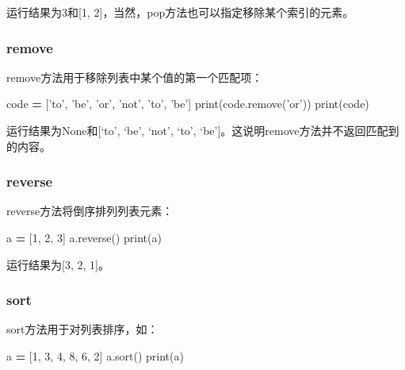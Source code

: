 \documentclass[]{ctexbook}
\newenvironment{Shaded}{\begin{snugshade}}{\end{snugshade}}
\newcommand{\BuiltInTok}[1]{#1}
\newcommand{\DecValTok}[1]{\textcolor[rgb]{0.00,0.00,0.81}{#1}}
\newcommand{\NormalTok}[1]{#1}
\newcommand{\OperatorTok}[1]{\textcolor[rgb]{0.81,0.36,0.00}{\textbf{#1}}}
\newcommand{\StringTok}[1]{\textcolor[rgb]{0.31,0.60,0.02}{#1}}
\begin{document}
运行结果为3和{[}1, 2{]}，当然，pop方法也可以指定移除某个索引的元素。

\hypertarget{remove}{%
\subsubsection{remove}\label{remove}}

remove方法用于移除列表中某个值的第一个匹配项：

\begin{Shaded}
\begin{Highlighting}[]
\NormalTok{code }\OperatorTok{=}\NormalTok{ [}\StringTok{'to'}\NormalTok{, }\StringTok{'be'}\NormalTok{, }\StringTok{'or'}\NormalTok{, }\StringTok{'not'}\NormalTok{, }\StringTok{'to'}\NormalTok{, }\StringTok{'be'}\NormalTok{]}
\BuiltInTok{print}\NormalTok{(code.remove(}\StringTok{'or'}\NormalTok{))}
\BuiltInTok{print}\NormalTok{(code)}
\end{Highlighting}
\end{Shaded}

运行结果为None和{[}`to', `be', `not', `to', `be'{]}。这说明remove方法并不返回匹配到的内容。

\hypertarget{reverse}{%
\subsubsection{reverse}\label{reverse}}

reverse方法将倒序排列列表元素：

\begin{Shaded}
\begin{Highlighting}[]
\NormalTok{a }\OperatorTok{=}\NormalTok{ [}\DecValTok{1}\NormalTok{, }\DecValTok{2}\NormalTok{, }\DecValTok{3}\NormalTok{]}
\NormalTok{a.reverse()}
\BuiltInTok{print}\NormalTok{(a)}
\end{Highlighting}
\end{Shaded}

运行结果为{[}3, 2, 1{]}。

\hypertarget{sort}{%
\subsubsection{sort}\label{sort}}

sort方法用于对列表排序，如：

\begin{Shaded}
\begin{Highlighting}[]
\NormalTok{a }\OperatorTok{=}\NormalTok{ [}\DecValTok{1}\NormalTok{, }\DecValTok{3}\NormalTok{, }\DecValTok{4}\NormalTok{, }\DecValTok{8}\NormalTok{, }\DecValTok{6}\NormalTok{, }\DecValTok{2}\NormalTok{]}
\NormalTok{a.sort()}
\BuiltInTok{print}\NormalTok{(a)}
\end{Highlighting}
\end{Shaded}
\end{document}

